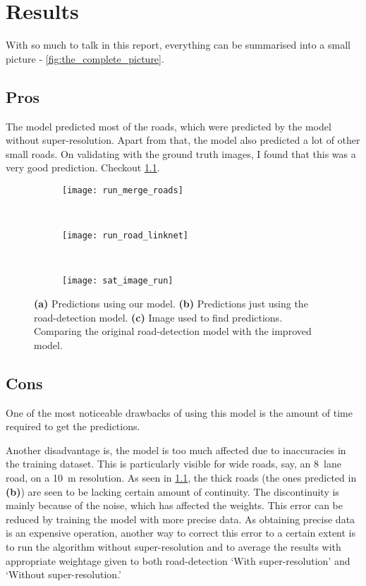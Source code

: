 \chapter{Results}\label{chapt:results}

With so much to talk in this report, everything can be summarised into a small picture - \cref{fig:the_complete_picture}.

\section{Pros}
The model predicted most of the roads, which were predicted by the model without super-resolution. Apart from that, the model also predicted a lot of other small roads. On validating with the ground truth images, I found that this was a very good prediction. Checkout \cref{fig:run_merge_road_maps}.

\begin{figure}[h!]
  \centering
  \begin{subfigure}{0.55\textwidth}
    \texttt{[image: run\_merge\_roads]}
    \caption{}
  \end{subfigure}~
  \begin{subfigure}{0.21\textwidth}
    \texttt{[image: run\_road\_linknet]}
    \caption{}
  \end{subfigure}~
  \begin{subfigure}{0.21\textwidth}
    \texttt{[image: sat\_image\_run]}
    \caption{}
  \end{subfigure}
  \caption[Predictions]{\textbf{(a)} Predictions using our model. \textbf{(b)} Predictions just using the road-detection model. \textbf{(c)} Image used to find predictions. Comparing the original road-detection model with the improved model.}
  \label{fig:run_merge_road_maps}
\end{figure}


\section{Cons}
One of the most noticeable drawbacks of using this model is the amount of time required to get the predictions. 

Another disadvantage is, the model is too much affected due to inaccuracies in the training dataset. This is particularly visible for wide roads, say, an 8~lane road, on a 10~m resolution. As seen in \cref{fig:run_merge_road_maps}, the thick roads (the ones predicted in \textbf{(b)}) are seen to be lacking certain amount of continuity. The discontinuity is mainly because of the noise, which has affected the weights. This error can be reduced by training the model with more precise data. As obtaining precise data is an expensive operation, another way to correct this error to a certain extent is to run the algorithm without super-resolution and to average the results with appropriate weightage given to both road-detection `With super-resolution' and `Without super-resolution.'

